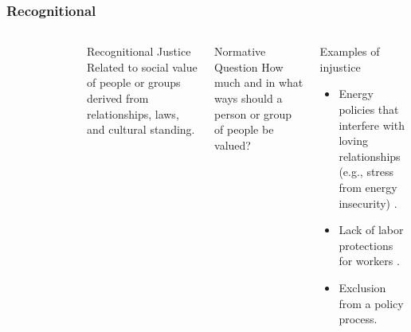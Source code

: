 \begin{frame}
    \frametitle{Recognitional}
    \begin{columns}
        \column[t]{3cm}
        \begin{figure}
            \centering
        \end{figure}
        \column[t]{7cm}
        \begin{block}{Recognitional Justice}
            Related to social value of people or groups derived from
            relationships, laws, and cultural standing.
        \end{block}
        \begin{block}{Normative Question}
            How much and in what ways should a person or group of people be
            valued?
        \end{block}
        \begin{block}{Examples of injustice}
            \begin{itemize}
                \item Energy policies that interfere with loving relationships
                (e.g., stress from energy
                insecurity) \cite{van_uffelen_revisiting_2022}.
                \item Lack of labor protections for
                workers \cite{van_uffelen_revisiting_2022}.
                \item Exclusion from a policy process\cite{van_uffelen_revisiting_2022}.
            \end{itemize}
        \end{block}
    \end{columns}
    
\end{frame}